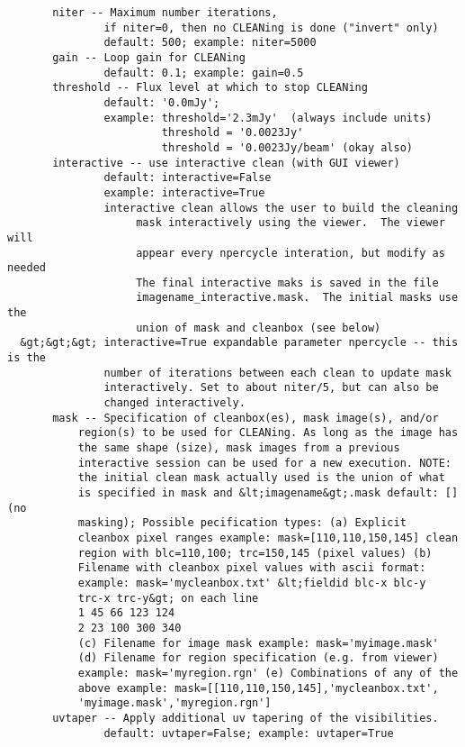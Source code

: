 \begin{verbatim}
       niter -- Maximum number iterations,
               if niter=0, then no CLEANing is done ("invert" only)
               default: 500; example: niter=5000
       gain -- Loop gain for CLEANing
               default: 0.1; example: gain=0.5
       threshold -- Flux level at which to stop CLEANing
               default: '0.0mJy'; 
               example: threshold='2.3mJy'  (always include units)
                        threshold = '0.0023Jy'
                        threshold = '0.0023Jy/beam' (okay also)
       interactive -- use interactive clean (with GUI viewer)
               default: interactive=False
               example: interactive=True
               interactive clean allows the user to build the cleaning
                    mask interactively using the viewer.  The viewer will
                    appear every npercycle interation, but modify as needed
                    The final interactive maks is saved in the file
                    imagename_interactive.mask.  The initial masks use the
                    union of mask and cleanbox (see below)
  &gt;&gt;&gt; interactive=True expandable parameter npercycle -- this is the
               number of iterations between each clean to update mask
               interactively. Set to about niter/5, but can also be
               changed interactively.
       mask -- Specification of cleanbox(es), mask image(s), and/or
           region(s) to be used for CLEANing. As long as the image has
           the same shape (size), mask images from a previous
           interactive session can be used for a new execution. NOTE:
           the initial clean mask actually used is the union of what
           is specified in mask and &lt;imagename&gt;.mask default: [] (no
           masking); Possible pecification types: (a) Explicit
           cleanbox pixel ranges example: mask=[110,110,150,145] clean
           region with blc=110,100; trc=150,145 (pixel values) (b)
           Filename with cleanbox pixel values with ascii format:
           example: mask='mycleanbox.txt' &lt;fieldid blc-x blc-y
           trc-x trc-y&gt; on each line 
           1 45 66 123 124 
           2 23 100 300 340
           (c) Filename for image mask example: mask='myimage.mask'
           (d) Filename for region specification (e.g. from viewer)
           example: mask='myregion.rgn' (e) Combinations of any of the
           above example: mask=[[110,110,150,145],'mycleanbox.txt',
           'myimage.mask','myregion.rgn']
       uvtaper -- Apply additional uv tapering of the visibilities.
               default: uvtaper=False; example: uvtaper=True

\end{verbatim}

